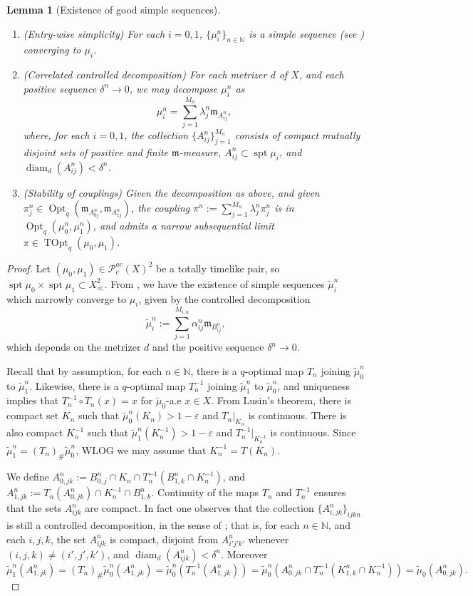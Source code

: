 \documentclass{article}
\renewcommand{\epsilon}{\varepsilon}
\newcommand{\N}{\mathbb{N}}
\newcommand{\m}{\mathfrak{m}}
\DeclareMathOperator{\spt}{spt}
\DeclareMathOperator{\diam}{diam}
\newcommand{\Pcal}{\mathcal{P}}
\DeclareMathOperator{\Opt}{Opt}
\DeclareMathOperator{\TOpt}{TOpt}
\newtheorem{lemma}[theorem]{Lemma}
\theoremstyle{definition}
\begin{document}
{\begin{lemma}[Existence of good simple sequences]
\begin{enumerate}
\item (Entry-wise simplicity) For each $i=0,1$, $\{\mu_i^n\}_{n\in\N}$ is a simple sequence (see ) converging to $\mu_i$.
\item (Correlated controlled decomposition) For each metrizer $d$ of $X$, and each positive sequence $\delta^n\to 0$, we may decompose $\mu_i^n$ as 
\[\mu_i^n= \sum_{j=1}^{M_n}\lambda_j^n \m_{A_{ij}^n},\]
where, for each $i=0,1$, the collection $\{A_{ij}^n\}_{j=1}^{M_n}$ consists of compact mutually disjoint sets of positive and finite $\m$-measure, $A_{ij}^n\subset \spt\mu_i$, and $\diam_d(A_{ij}^n)<\delta^n$.  
\item (Stability of couplings) Given the decomposition as above, and given $\pi_j^n\in \Opt_q(\m_{A_{0j}^n}, \m_{A_{1j}^n})$, the coupling $\pi^n:=\sum_{j=1}^{M_n}\lambda_j^n \pi_j^n$ is in $\Opt_q(\mu_0^n,\mu_1^n)$, and admits a narrow subsequential limit $\pi\in \TOpt_q(\mu_0, \mu_1)$. 
\end{enumerate}
\end{lemma}


\begin{proof}
Let $(\mu_0,\mu_1)\in\Pcal_c^{ac}(X)^2$ be a totally timelike pair, so $\spt\mu_0\times \spt\mu_1\subset X_\ll^2$. From , we have the existence of simple sequences $\tilde\mu_i^n$ which narrowly converge to $\mu_i$, given by the controlled decomposition 
\[\tilde \mu_i^n := \sum_{j=1}^{M_{i,n}} \alpha_{ij}^n \m_{B_{ij}^n},\]
which depends on the metrizer $d$ and the positive sequence $\delta^n\to 0$. 

Recall that by assumption, for each $n\in\N$, there is a $q$-optimal map $T_n$ joining $\tilde\mu^n_0$ to $\tilde\mu_1^n$. Likewise, there is a $q$-optimal map $T_n^{-1}$ joining $\tilde\mu^n_1$ to $\tilde\mu_0^n$, and uniqueness implies that $T_n^{-1}\circ T_n(x)=x$ for $\tilde\mu_0$-a.e $x\in X$. From Lusin's theorem, there is compact set $K_n$ such that $\tilde\mu_0^n( K_n)>1-\epsilon$ and $T_n|_{K_n}$ is continuous. There is also compact $K_n^{-1}$ such that $\tilde \mu_1^n(K_n^{-1})>1-\epsilon$ and $T_n^{-1}|_{K_n^{-1}}$ is continuous. Since $\tilde \mu_1^n=(T_n)_\# \tilde \mu_0^n$, WLOG we may assume that $K_n^{-1}=T(K_n)$.  

We define $ A_{0,jk}^n:= B_{0,j}^n \cap K_n\cap T_n^{-1}(B_{1,k}^n\cap K_n^{-1})$, and $ A_{1,jk}^n:= T_n( A_{0,jk}^n)\cap K_n^{-1}\cap B_{1,k}^n$. Continuity of the maps $T_n$ and $T_n^{-1}$ ensures that the sets $A_{ijk}^n$ are compact. In fact one observes that the collection $\{ A_{i,jk}^n\}_{ijkn}$ is still a controlled decomposition, in the sense of ; that is, for each $n\in\N$, and each $i,j,k$, the set $A_{ijk}^n$ is compact, disjoint from $A_{i'j'k'}^n$ whenever $(i,j,k)\neq (i',j',k')$, and $\diam_d(A_{ijk}^n)<\delta^n$. Moreover 
\[\tilde \mu_1^n( A_{1,jk}^n)=(T_n)_\#\tilde \mu_0^n( A_{1,jk}^n) =\tilde\mu_0^n(T_n^{-1}(A_{1,jk}^n))=\tilde\mu_0^n(A_{0,jk}^n\cap T^{-1}_n(K_{1,k}^n\cap K_n^{-1})) = \tilde\mu_0(A_{0,jk}^n).  \]


\end{proof}}
\end{document}
